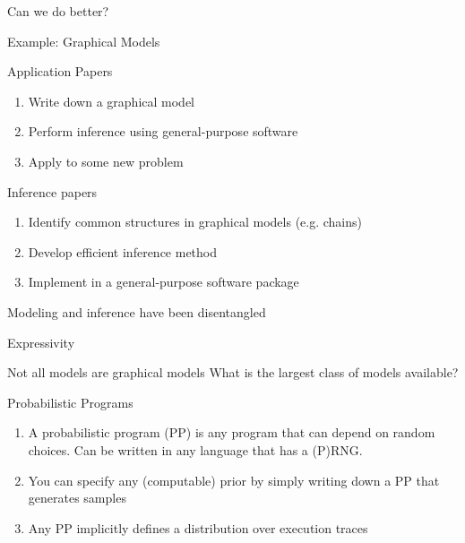 \begin{frame}{Can we do better?}
  \begin{block}{Example: Graphical Models}  
  \end{block}
      \begin{block}{Application Papers}
      \begin{enumerate}
        \item Write down a graphical model
        \item Perform inference using general-purpose software
        \item Apply to some new problem
      \end{enumerate}
    \end{block}
      \begin{block}{Inference papers}
      \begin{enumerate}
        \item Identify common structures in graphical models (e.g. chains)
        \item Develop efficient inference method
        \item Implement in a general-purpose software package
      \end{enumerate}
    \end{block}  
  \begin{block}{}
      \vspace{-2\baselineskip}
  \large
    \begin{center}
    {
      {Modeling and inference have been disentangled}
    }	
    \end{center}
  \end{block}
\end{frame}



\begin{frame}{Expressivity}
  \begin{block}{Not all models are graphical models}  
  What is the largest class of models available?
  \end{block}
  \vspace{\baselineskip}
  \begin{block}{Probabilistic Programs}
      \begin{enumerate}
        \item A probabilistic program (PP) is any program that can depend on random choices.  Can be written in any language that has a (P)RNG.
        \item You can specify any (computable) prior by simply writing down a PP that generates samples
        \item Any PP implicitly defines a distribution over execution traces
      \end{enumerate}
    \end{block}
\end{frame}

